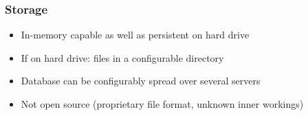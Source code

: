 
\begin{frame}
\frametitle{Storage}
\begin{itemize}
\item In-memory capable as well as persistent on hard drive
\item If on hard drive: files in a configurable directory
\item Database can be configurably spread over several servers
\item Not open source (proprietary file format, unknown inner workings)
\end{itemize}
\end{frame} 
